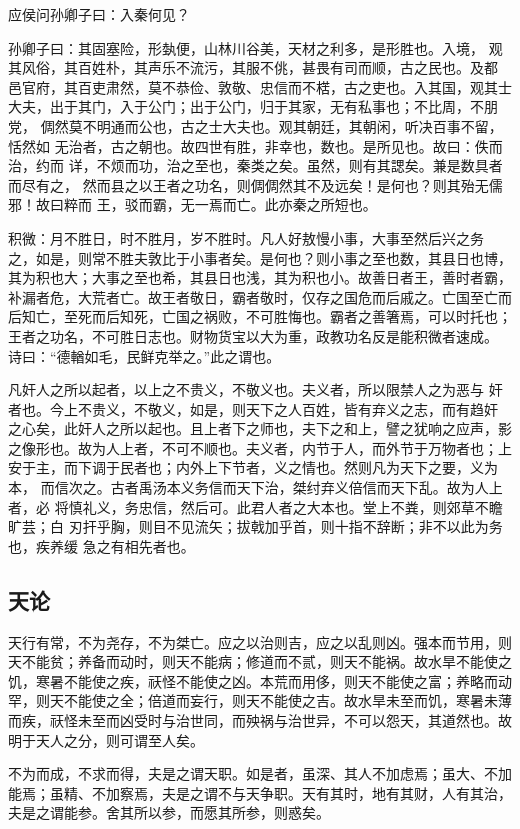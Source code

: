 \documentclass[]{article}
\begin{document}
应侯问孙卿子曰：入秦何见？

孙卿子曰：其固塞险，形埶便，山林川谷美，天材之利多，是形胜也。入境，
观其风俗，其百姓朴，其声乐不流污，其服不佻，甚畏有司而顺，古之民也。及都
邑官府，其百吏肃然，莫不恭俭、敦敬、忠信而不楛，古之吏也。入其国，观其士
大夫，出于其门，入于公门；出于公门，归于其家，无有私事也；不比周，不朋党，
倜然莫不明通而公也，古之士大夫也。观其朝廷，其朝闲，听决百事不留，恬然如
无治者，古之朝也。故四世有胜，非幸也，数也。是所见也。故曰：佚而治，约而
详，不烦而功，治之至也，秦类之矣。虽然，则有其諰矣。兼是数具者而尽有之，
然而县之以王者之功名，则倜倜然其不及远矣！是何也？则其殆无儒邪！故曰粹而
王，驳而霸，无一焉而亡。此亦秦之所短也。

积微：月不胜日，时不胜月，岁不胜时。凡人好敖慢小事，大事至然后兴之务
之，如是，则常不胜夫敦比于小事者矣。是何也？则小事之至也数，其县日也博，
其为积也大；大事之至也希，其县日也浅，其为积也小。故善日者王，善时者霸，
补漏者危，大荒者亡。故王者敬日，霸者敬时，仅存之国危而后戚之。亡国至亡而
后知亡，至死而后知死，亡国之祸败，不可胜悔也。霸者之善箸焉，可以时托也；
王者之功名，不可胜日志也。财物货宝以大为重，政教功名反是能积微者速成。
诗曰：``德輶如毛，民鲜克举之。''此之谓也。

凡奸人之所以起者，以上之不贵义，不敬义也。夫义者，所以限禁人之为恶与
奸者也。今上不贵义，不敬义，如是，则天下之人百姓，皆有弃义之志，而有趋奸
之心矣，此奸人之所以起也。且上者下之师也，夫下之和上，譬之犹响之应声，影
之像形也。故为人上者，不可不顺也。夫义者，内节于人，而外节于万物者也；上
安于主，而下调于民者也；内外上下节者，义之情也。然则凡为天下之要，义为本，
而信次之。古者禹汤本义务信而天下治，桀纣弃义倍信而天下乱。故为人上者，必
将慎礼义，务忠信，然后可。此君人者之大本也。堂上不粪，则郊草不瞻旷芸；白
刃扞乎胸，则目不见流矢；拔戟加乎首，则十指不辞断；非不以此为务也，疾养缓
急之有相先者也。

\hypertarget{header-n76}{%
\subsection{天论}\label{header-n76}}

天行有常，不为尧存，不为桀亡。应之以治则吉，应之以乱则凶。强本而节用，则天不能贫；养备而动时，则天不能病；修道而不贰，则天不能祸。故水旱不能使之饥，寒暑不能使之疾，祆怪不能使之凶。本荒而用侈，则天不能使之富；养略而动罕，则天不能使之全；倍道而妄行，则天不能使之吉。故水旱未至而饥，寒暑未薄而疾，祆怪未至而凶受时与治世同，而殃祸与治世异，不可以怨天，其道然也。故明于天人之分，则可谓至人矣。

不为而成，不求而得，夫是之谓天职。如是者，虽深、其人不加虑焉；虽大、不加能焉；虽精、不加察焉，夫是之谓不与天争职。天有其时，地有其财，人有其治，夫是之谓能参。舍其所以参，而愿其所参，则惑矣。
\end{document}
